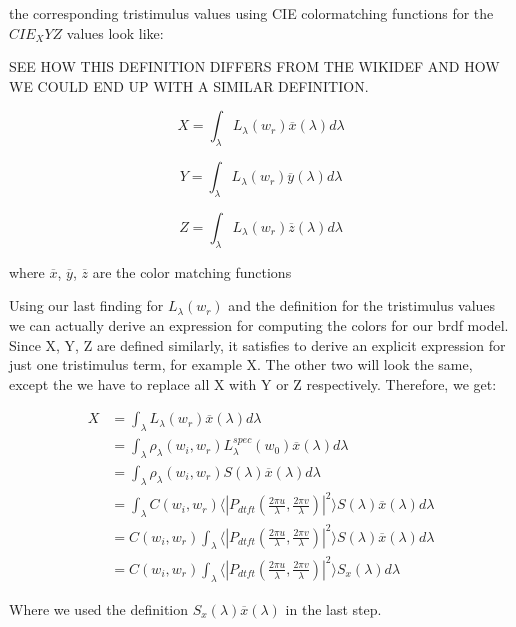 the corresponding tristimulus values using CIE colormatching functions for the $CIE_XYZ$ values look like:

SEE HOW THIS DEFINITION DIFFERS FROM THE WIKIDEF AND HOW WE COULD END UP WITH A SIMILAR DEFINITION.

\begin{equation}
X = \int_{\lambda}L_\lambda(w_r)\overline{x}(\lambda)d\lambda
\end{equation} 

\begin{equation}
Y = \int_{\lambda}L_\lambda(w_r)\overline{y}(\lambda)d\lambda
\end{equation}

\begin{equation}
Z = \int_{\lambda}L_\lambda(w_r)\overline{z}(\lambda)d\lambda
\end{equation}

where $\overline{x}$, $\overline{y}$, $\overline{z}$ are the color matching functions

Using our last finding for $L_\lambda(w_r)$ and the definition for the tristimulus values we can actually derive an expression for computing the colors for our brdf model. Since X, Y, Z are defined similarly, it satisfies to derive an explicit expression for just one tristimulus term, for example X. The other two will look the same, except the we have to replace all X with Y or Z respectively. Therefore, we get:

\begin{align*}
X 
& =\int_{\lambda}L_\lambda(w_r)\overline{x}(\lambda)d\lambda \\
& =\int_{\lambda}\rho_\lambda(w_i,w_r)L_\lambda^{spec}(w_0) \overline{x}(\lambda)d\lambda \\
& =\int_{\lambda}\rho_\lambda(w_i,w_r) S(\lambda) \overline{x}(\lambda)d\lambda \\
& =\int_{\lambda} C(w_i,w_r) \langle \left|P_{dtft}(\frac{2\pi u}{\lambda}, \frac{2\pi v}{\lambda})\right|^2\rangle S(\lambda) \overline{x}(\lambda)d\lambda \\
& = C(w_i,w_r) \int_{\lambda} \langle \left|P_{dtft}(\frac{2\pi u}{\lambda}, \frac{2\pi v}{\lambda})\right|^2\rangle S(\lambda) \overline{x}(\lambda)d\lambda \\
& = C(w_i,w_r) \int_{\lambda} \langle \left|P_{dtft}(\frac{2\pi u}{\lambda}, \frac{2\pi v}{\lambda})\right|^2\rangle S_x(\lambda)d\lambda
\end{align*}

Where we used the definition $S_x(\lambda)\overline{x}(\lambda)$ in the last step.

